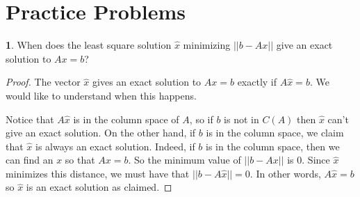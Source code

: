 \documentclass{article}
\theoremstyle{definition}
\newtheorem{prob}{}
\begin{document}
\section*{Practice Problems}
\begin{prob}
	When does the least square solution $\hat{x}$ minimizing $||b-Ax||$ give an exact solution to $Ax=b$?
\end{prob}

\begin{proof}
	The vector $\hat{x}$ gives an exact solution to $Ax=b$ exactly if $A\hat{x}=b$. We would like to understand when this happens.
	
	Notice that $A \hat{x}$ is in the column space of $A$, so if $b$ is not in $C(A)$ then $\hat{x}$ can't give an exact solution. On the other hand, if $b$ is in the column space, we claim that $\hat{x}$ is always an exact solution. Indeed, if $b$ is in the column space, then we can find an $x$ so that $Ax=b$. So the minimum value of $||b-Ax||$ is 0. Since $\hat{x}$ minimizes this distance, we must have that $||b-A\hat{x}||=0$. In other words, $A\hat{x}=b$ so $\hat{x}$ is an exact solution as claimed.
\end{proof}
\end{document}
